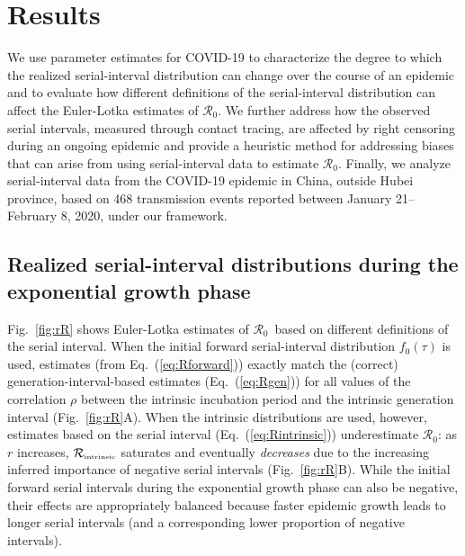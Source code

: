 \documentclass[12pt]{article}
\newcommand{\eref}[1]{Eq.~(\ref{eq:#1})}
\newcommand{\fref}[1]{Fig.~\ref{fig:#1}}
\newcommand{\Rx}[1]{\ensuremath{{\mathcal R}_{#1}}\xspace}
\newcommand{\Ro}{\Rx{0}}
\newcommand{\Rintrinsic}{\ensuremath{{\mathcal R}_{\textrm{\tiny intrinsic}}}\xspace}
\begin{document}
\section{Results}

We use parameter estimates for COVID-19 to characterize the degree to which the realized serial-interval distribution can change over the course of an epidemic and to evaluate how different definitions of the serial-interval distribution can affect the Euler-Lotka estimates of \Ro.
We further address how the observed serial intervals, measured through contact tracing, are affected by right censoring during an ongoing epidemic and provide a heuristic method for addressing biases that can arise from using serial-interval data to estimate \Ro. 
Finally, we analyze serial-interval data from the COVID-19 epidemic in China, outside Hubei province, based on 468 transmission events reported between January 21--February 8, 2020, under our framework.

\subsection{Realized serial-interval distributions during the exponential growth phase}

\fref{rR} shows Euler-Lotka estimates of \Ro\ based on different definitions of the serial interval. 
When the initial forward serial-interval distribution $f_0(\tau)$ is used, estimates (from \eref{Rforward}) exactly match the (correct) generation-interval-based estimates (\eref{Rgen}) for all values of the correlation $\rho$ between the intrinsic incubation period and the intrinsic generation interval (\fref{rR}A).
When the intrinsic distributions are used, however, estimates based on the serial interval (\eref{Rintrinsic}) underestimate \Ro: as $r$ increases, \Rintrinsic saturates and eventually \emph{decreases} due to the increasing inferred importance of negative serial intervals (\fref{rR}B).
While the initial forward serial intervals during the exponential growth phase can also be negative, their effects are appropriately balanced because faster epidemic growth leads to longer serial intervals (and a corresponding lower proportion of negative intervals).
\end{document}
